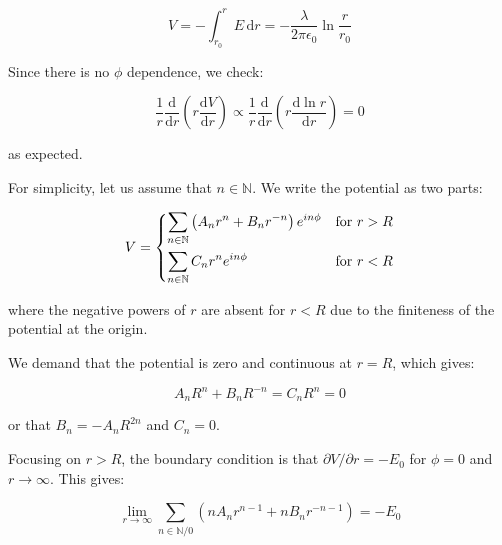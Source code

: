 \documentclass[12pt]{article}
\begin{document}
\begin{equation}
    V = -\int_{r_{0}}^{r} E \, \mathrm{d}r = -\frac{\lambda}{2\pi\epsilon_{0}} \ln{\frac{r}{r_{0}}}
\end{equation}

Since there is no $\phi$ dependence, we check:

\begin{equation}
    \frac{1}{r} \frac{\mathrm{d}}{\mathrm{d}r} \left( r \frac{\mathrm{d}V}{\mathrm{d}r} \right) \propto \frac{1}{r} \frac{\mathrm{d}}{\mathrm{d}r} \left( r \frac{\mathrm{d}\ln{r}}{\mathrm{d}r} \right) = 0
\end{equation}

as expected.

For simplicity, let us assume that $n \in \mathbb{N}$. We write the potential as two parts:

\begin{equation}
V =
\begin{dcases}
    \sum_{n \in \mathbb{N}} \left( A_{n} r^{n} + B_{n} r^{-n} \right) e^{in\phi} & \text{for } r > R \\
    \sum_{n \in \mathbb{N}} C_{n} r^{n} e^{in\phi} & \text{for } r < R
\end{dcases}
\end{equation}

where the negative powers of $r$ are absent for $r < R$ due to the finiteness of the potential at the origin.

We demand that the potential is zero and continuous at $r = R$, which gives:

\begin{equation}
    A_{n} R^{n} + B_{n} R^{-n} = C_{n} R^{n} = 0
\end{equation}

or that $B_{n} = -A_{n} R^{2n}$ and $C_{n} = 0$.

Focusing on $r > R$, the boundary condition is that $\partial V/\partial r = -E_{0}$ for $\phi = 0$ and $r \to \infty$. This gives:

\begin{equation}
    \lim_{r \to \infty} \sum_{n \in \mathbb{N}/0} \left( n A_{n} r^{n-1} + n B_{n} r^{-n-1} \right) = -E_{0}
\end{equation}


\end{document}
